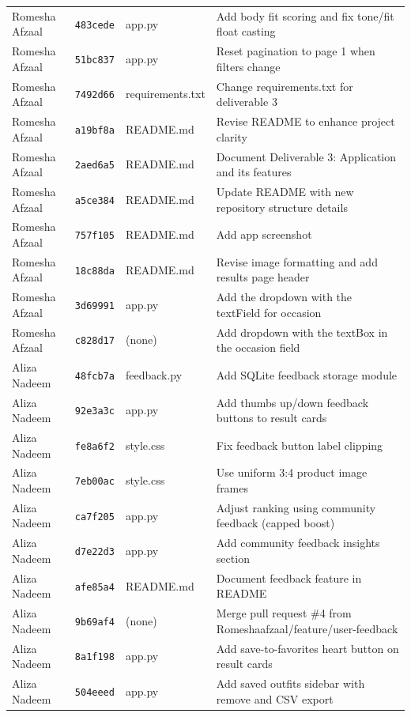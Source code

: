 \begin{longtable}{p{2.6cm}p{1.3cm}p{4.4cm}p{6.2cm}}
Romesha Afzaal & \texttt{483cede} & app.py & Add body fit scoring and fix tone/fit float casting \\
Romesha Afzaal & \texttt{51bc837} & app.py & Reset pagination to page 1 when filters change \\
Romesha Afzaal & \texttt{7492d66} & requirements.txt & Change requirements.txt for deliverable 3 \\
Romesha Afzaal & \texttt{a19bf8a} & README.md & Revise README to enhance project clarity \\
Romesha Afzaal & \texttt{2aed6a5} & README.md & Document Deliverable 3: Application and its features \\
Romesha Afzaal & \texttt{a5ce384} & README.md & Update README with new repository structure details \\
Romesha Afzaal & \texttt{757f105} & README.md & Add app screenshot \\
Romesha Afzaal & \texttt{18c88da} & README.md & Revise image formatting and add results page header \\
Romesha Afzaal & \texttt{3d69991} & app.py & Add the dropdown with the textField for occasion \\
Romesha Afzaal & \texttt{c828d17} & (none) & Add dropdown with the textBox in the occasion field \\
Aliza Nadeem & \texttt{48fcb7a} & feedback.py & Add SQLite feedback storage module \\
Aliza Nadeem & \texttt{92e3a3c} & app.py & Add thumbs up/down feedback buttons to result cards \\
Aliza Nadeem & \texttt{fe8a6f2} & style.css & Fix feedback button label clipping \\
Aliza Nadeem & \texttt{7eb00ac} & style.css & Use uniform 3:4 product image frames \\
Aliza Nadeem & \texttt{ca7f205} & app.py & Adjust ranking using community feedback (capped boost) \\
Aliza Nadeem & \texttt{d7e22d3} & app.py & Add community feedback insights section \\
Aliza Nadeem & \texttt{afe85a4} & README.md & Document feedback feature in README \\
Aliza Nadeem & \texttt{9b69af4} & (none) & Merge pull request \#4 from Romeshaafzaal/feature/user-feedback \\
Aliza Nadeem & \texttt{8a1f198} & app.py & Add save-to-favorites heart button on result cards \\
Aliza Nadeem & \texttt{504eeed} & app.py & Add saved outfits sidebar with remove and CSV export \\

\end{longtable}
